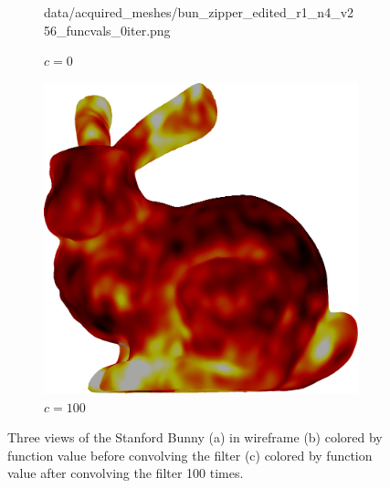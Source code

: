 \begin{figure}[ht]
\begin{subfigure}[b]{0.32\linewidth}
		{data/acquired_meshes/bun_zipper_edited_r1_n4_v256_funcvals_0iter.png}
		\caption{$c=0$}\label{fig:bun.b}
	\end{subfigure}
	\begin{subfigure}[b]{0.32\linewidth}
		\includegraphics[width=\linewidth]
		{data/acquired_meshes/bun_zipper_edited_r1_n4_v256_funcvals_100iter.png}
		\caption{$c=100$}\label{fig:bun.c}
	\end{subfigure}
	\caption[Three Views of the Stanford Bunny]{Three views of the Stanford Bunny (a) in wireframe (b) colored by function value before convolving the filter (c) colored by function value after convolving the filter 100 times.}
	\label{fig:bun}
\end{figure}
